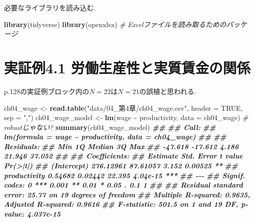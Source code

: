 \documentclass[
]{book}
\newenvironment{Shaded}{\begin{snugshade}}{\end{snugshade}}
\newcommand{\AttributeTok}[1]{\textcolor[rgb]{0.13,0.29,0.53}{#1}}
\newcommand{\CommentTok}[1]{\textcolor[rgb]{0.56,0.35,0.01}{\textit{#1}}}
\newcommand{\ConstantTok}[1]{\textcolor[rgb]{0.56,0.35,0.01}{#1}}
\newcommand{\DocumentationTok}[1]{\textcolor[rgb]{0.56,0.35,0.01}{\textbf{\textit{#1}}}}
\newcommand{\FunctionTok}[1]{\textcolor[rgb]{0.13,0.29,0.53}{\textbf{#1}}}
\newcommand{\NormalTok}[1]{#1}
\newcommand{\OtherTok}[1]{\textcolor[rgb]{0.56,0.35,0.01}{#1}}
\newcommand{\SpecialCharTok}[1]{\textcolor[rgb]{0.81,0.36,0.00}{\textbf{#1}}}
\newcommand{\StringTok}[1]{\textcolor[rgb]{0.31,0.60,0.02}{#1}}
\begin{document}
必要なライブラリを読み込む.

\begin{Shaded}
\begin{Highlighting}[]
\FunctionTok{library}\NormalTok{(tidyverse)}
\FunctionTok{library}\NormalTok{(openxlsx) }\CommentTok{\# Excelファイルを読み取るためのパッケージ}
\end{Highlighting}
\end{Shaded}

\hypertarget{ux5b9fux8a3cux4f8b4.1-ux52b4ux50cdux751fux7523ux6027ux3068ux5b9fux8ceaux8cc3ux91d1ux306eux95a2ux4fc2}{%
\section*{実証例4.1 労働生産性と実質賃金の関係}\label{ux5b9fux8a3cux4f8b4.1-ux52b4ux50cdux751fux7523ux6027ux3068ux5b9fux8ceaux8cc3ux91d1ux306eux95a2ux4fc2}}

p.128の実証例ブロック内の\(N=22\)は\(N=21\)の誤植と思われる.

\begin{Shaded}
\begin{Highlighting}[]
\NormalTok{ch04\_wage }\OtherTok{\textless{}{-}} \FunctionTok{read.table}\NormalTok{(}\StringTok{"data/04\_第4章/ch04\_wage.csv"}\NormalTok{, }\AttributeTok{header =} \ConstantTok{TRUE}\NormalTok{, }\AttributeTok{sep =} \StringTok{","}\NormalTok{)}
\NormalTok{ch04\_wage\_model }\OtherTok{\textless{}{-}} \FunctionTok{lm}\NormalTok{(wage }\SpecialCharTok{\textasciitilde{}}\NormalTok{ productivity, }\AttributeTok{data =}\NormalTok{ ch04\_wage) }\CommentTok{\# robustじゃない?}
\FunctionTok{summary}\NormalTok{(ch04\_wage\_model)}
\DocumentationTok{\#\# }
\DocumentationTok{\#\# Call:}
\DocumentationTok{\#\# lm(formula = wage \textasciitilde{} productivity, data = ch04\_wage)}
\DocumentationTok{\#\# }
\DocumentationTok{\#\# Residuals:}
\DocumentationTok{\#\#     Min      1Q  Median      3Q     Max }
\DocumentationTok{\#\# {-}47.618 {-}17.612   4.186  21.946  37.052 }
\DocumentationTok{\#\# }
\DocumentationTok{\#\# Coefficients:}
\DocumentationTok{\#\#               Estimate Std. Error t value Pr(\textgreater{}|t|)    }
\DocumentationTok{\#\# (Intercept)  276.12961   87.61057   3.152  0.00525 ** }
\DocumentationTok{\#\# productivity   0.54682    0.02442  22.395 4.04e{-}15 ***}
\DocumentationTok{\#\# {-}{-}{-}}
\DocumentationTok{\#\# Signif. codes:  0 \textquotesingle{}***\textquotesingle{} 0.001 \textquotesingle{}**\textquotesingle{} 0.01 \textquotesingle{}*\textquotesingle{} 0.05 \textquotesingle{}.\textquotesingle{} 0.1 \textquotesingle{} \textquotesingle{} 1}
\DocumentationTok{\#\# }
\DocumentationTok{\#\# Residual standard error: 25.77 on 19 degrees of freedom}
\DocumentationTok{\#\# Multiple R{-}squared:  0.9635, Adjusted R{-}squared:  0.9616 }
\DocumentationTok{\#\# F{-}statistic: 501.5 on 1 and 19 DF,  p{-}value: 4.037e{-}15}
\end{Highlighting}
\end{Shaded}
\end{document}
